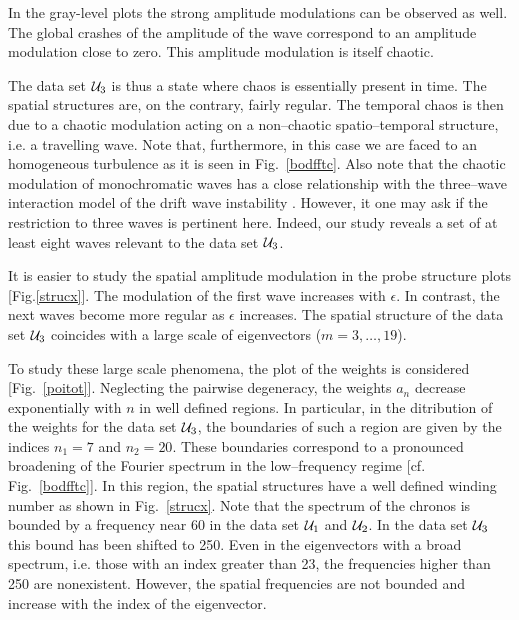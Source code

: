 \medskip

In the gray-level 
plots the strong amplitude modulations can be observed as well.
The global  crashes of the amplitude of the wave correspond to
an amplitude modulation close to zero. This amplitude modulation
is itself chaotic.





The data set ${\cal U}_3$ is thus  a state where  chaos is 
essentially present in time.
The spatial structures are, on the contrary, fairly regular.
The temporal chaos is then due to a chaotic modulation acting  on a 
non--chaotic spatio--temporal structure, i.e. a travelling wave.
Note that, furthermore, in this case we are faced to an
homogeneous turbulence \cite{Lumley} as it is seen in Fig.~\ref{bodfftc}.
Also note that the chaotic modulation of monochromatic
waves has a close relationship with
the three--wave interaction model of  the drift wave instability 
\cite{horton90}. 
However, it one may ask if the restriction to three waves 
is pertinent here. 
Indeed, our study reveals a set of at least eight  
waves relevant to the data set ${\cal U}_3$.

\medskip

It is easier to study the spatial amplitude modulation
in the probe structure plots [Fig.\ref{strucx}].
The modulation of the first wave increases with $\epsilon$. 
In contrast, the next waves become more regular as $\epsilon$ increases.
The spatial structure of the data set ${\cal U}_3$ coincides
with a large scale of eigenvectors ($m=3,\dots,19$).

\medskip

To study these large scale phenomena, the plot of the weights is 
considered [Fig.~\ref{poitot}]. Neglecting the pairwise degeneracy,
 the weights $a_n$ decrease exponentially 
with $n$ in well defined regions.
In particular, in the ditribution of the weights for the data set 
${\cal U}_3$, the boundaries of such a region are given by the indices
$n_1=7$ and $n_2=20$. These boundaries correspond to a pronounced
broadening of the Fourier spectrum in the low--frequency regime 
[cf. Fig.~\ref{bodfftc}]. In this region, the spatial structures
have a well defined winding number as shown in
Fig.~\ref{strucx}.
Note that the spectrum of the chronos is bounded by a frequency 
near 60 in the data set ${\cal U}_1$ and ${\cal U}_2$.
In the data set ${\cal U}_3$ this bound has been shifted to 250. 
Even in the eigenvectors with a broad spectrum, i.e. those 
with an index greater than 23, the frequencies higher than 250 
are nonexistent. 
However, the spatial frequencies are not bounded and increase with the
index of the eigenvector.

